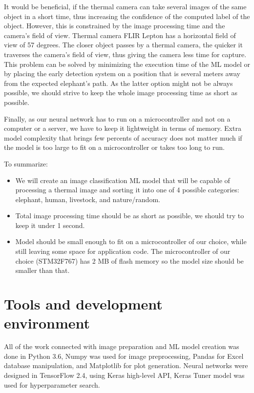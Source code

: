 It would be beneficial, if the thermal camera can take several images of the same object in a short time, thus increasing the confidence of the computed label of the object.
However, this is constrained by the image processing time and the camera's field of view.
Thermal camera FLIR Lepton has a horizontal field of view of 57 degrees.
The closer object passes by a thermal camera, the quicker it traverses the camera's field of view, thus giving the camera less time for capture.
This problem can be solved by minimizing the execution time of the ML model or by placing the early detection system on a position that is several meters away from the expected elephant's path.
As the latter option might not be always possible, we should strive to keep the whole image processing time as short as possible.

Finally, as our neural network has to run on a microcontroller and not on a computer or a server, we have to keep it lightweight in terms of memory.
Extra model complexity that brings few percents of accuracy does not matter much if the model is too large to fit on a microcontroller or takes too long to run.

To summarize:

\begin{itemize}
    \item We will create an image classification ML model that will be capable of processing a thermal image and sorting it into one of 4 possible categories: elephant, human, livestock, and nature/random.
    \item Total image processing time should be as short as possible, we should try to keep it under 1 second.
    \item Model should be small enough to fit on a microcontroller of our choice, while still leaving some space for application code. The microcontroller of our choice (STM32F767) has 2 MB of flash memory so the model size should be smaller than that.
\end{itemize}


\section{ Tools and development environment}

All of the work connected with image preparation and ML model creation was done in Python 3.6, Numpy was used for image preprocessing, Pandas for Excel database manipulation, and Matplotlib for plot generation.
Neural networks were designed in TensorFlow 2.4, using Keras high-level API, Keras Tuner model was used for hyperparameter search.

